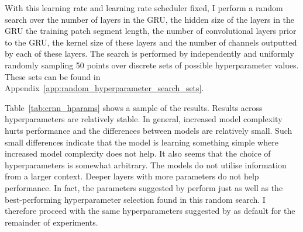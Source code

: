 With this learning rate and learning rate scheduler fixed, I perform a random search over the number of layers in the GRU, the hidden size of the layers in the GRU the training patch segment length, the number of convolutional layers prior to the GRU, the kernel size of these layers and the number of channels outputted by each of these layers. The search is performed by independently and uniformly randomly sampling 50 points over discrete sets of possible hyperparameter values. These sets can be found in Appendix~\ref{app:random_hyperparameter_search_sets}. 

Table~\ref{tab:crnn_hparams} shows a sample of the results. Results across hyperparameters are relatively stable. In general, increased model complexity hurts performance and the differences between models are relatively small. Such small differences indicate that the model is learning something simple where increased model complexity does not help. It also seems that the choice of hyperparameters is somewhat arbitrary. The models do not utilise information from a larger context. Deeper layers with more parameters do not help performance. In fact, the parameters suggested by \citet{StructuredTraining} perform just as well as the best-performing hyperparameter selection found in this random search. I therefore proceed with the same hyperparameters suggested by \citet{StructuredTraining} as default for the remainder of experiments.


